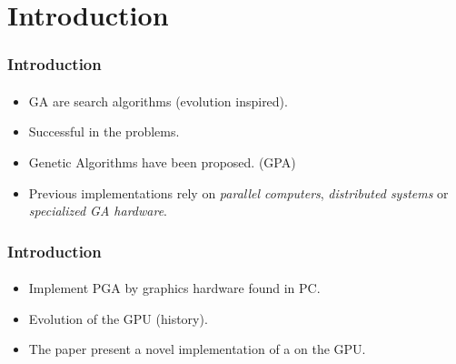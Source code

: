 \section{Introduction}
\frame
{
\frametitle{Introduction}
\framesubtitle{}
\begin{itemize}
	\item GA are  search algorithms (evolution inspired).
	\item Successful in the  problems.
	\item {} Genetic Algorithms have been proposed. (GPA)
	\item Previous implementations rely on \emph{parallel computers},
		\emph{distributed systems} or \emph{specialized GA hardware}.
\end{itemize}
}

\frame
{
\frametitle{Introduction}
\framesubtitle{}
\begin{itemize}
	\item Implement PGA by  graphics hardware found in PC.
	\item Evolution of the GPU (history).
	\item The paper present a novel implementation of a  on the GPU.
\end{itemize}
}
